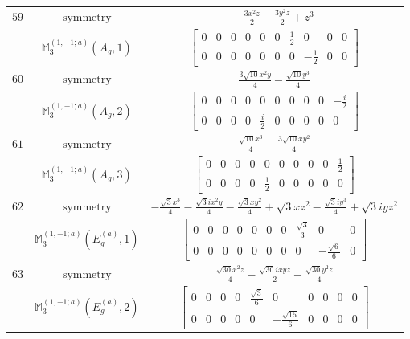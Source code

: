 \documentclass[fleqn,8pt,landscape]{jsarticle}
\begin{document}
\begin{longtable}{ccc}
$ 59 $ & $ \text{symmetry} $ & $ - \frac{3 x^{2} z}{2} - \frac{3 y^{2} z}{2} + z^{3} $ \\
$  $ & $ \mathbb{M}_{3}^{(1,-1;a)}(A_{g},1) $ & $ \begin{bmatrix} 0 & 0 & 0 & 0 & 0 & 0 & \frac{1}{2} & 0 & 0 & 0 \\ 0 & 0 & 0 & 0 & 0 & 0 & 0 & - \frac{1}{2} & 0 & 0 \end{bmatrix} $ \\ \hline
$ 60 $ & $ \text{symmetry} $ & $ \frac{3 \sqrt{10} x^{2} y}{4} - \frac{\sqrt{10} y^{3}}{4} $ \\
$  $ & $ \mathbb{M}_{3}^{(1,-1;a)}(A_{g},2) $ & $ \begin{bmatrix} 0 & 0 & 0 & 0 & 0 & 0 & 0 & 0 & 0 & - \frac{i}{2} \\ 0 & 0 & 0 & 0 & \frac{i}{2} & 0 & 0 & 0 & 0 & 0 \end{bmatrix} $ \\ \hline
$ 61 $ & $ \text{symmetry} $ & $ \frac{\sqrt{10} x^{3}}{4} - \frac{3 \sqrt{10} x y^{2}}{4} $ \\
$  $ & $ \mathbb{M}_{3}^{(1,-1;a)}(A_{g},3) $ & $ \begin{bmatrix} 0 & 0 & 0 & 0 & 0 & 0 & 0 & 0 & 0 & \frac{1}{2} \\ 0 & 0 & 0 & 0 & \frac{1}{2} & 0 & 0 & 0 & 0 & 0 \end{bmatrix} $ \\ \hline
$ 62 $ & $ \text{symmetry} $ & $ - \frac{\sqrt{3} x^{3}}{4} - \frac{\sqrt{3} i x^{2} y}{4} - \frac{\sqrt{3} x y^{2}}{4} + \sqrt{3} x z^{2} - \frac{\sqrt{3} i y^{3}}{4} + \sqrt{3} i y z^{2} $ \\
$  $ & $ \mathbb{M}_{3}^{(1,-1;a)}(E_{g}^{(a)},1) $ & $ \begin{bmatrix} 0 & 0 & 0 & 0 & 0 & 0 & 0 & \frac{\sqrt{3}}{3} & 0 & 0 \\ 0 & 0 & 0 & 0 & 0 & 0 & 0 & 0 & - \frac{\sqrt{6}}{6} & 0 \end{bmatrix} $ \\ \hline
$ 63 $ & $ \text{symmetry} $ & $ \frac{\sqrt{30} x^{2} z}{4} - \frac{\sqrt{30} i x y z}{2} - \frac{\sqrt{30} y^{2} z}{4} $ \\
$  $ & $ \mathbb{M}_{3}^{(1,-1;a)}(E_{g}^{(a)},2) $ & $ \begin{bmatrix} 0 & 0 & 0 & 0 & \frac{\sqrt{3}}{6} & 0 & 0 & 0 & 0 & 0 \\ 0 & 0 & 0 & 0 & 0 & - \frac{\sqrt{15}}{6} & 0 & 0 & 0 & 0 \end{bmatrix} $ \\ \hline

\end{longtable}
\end{document}
